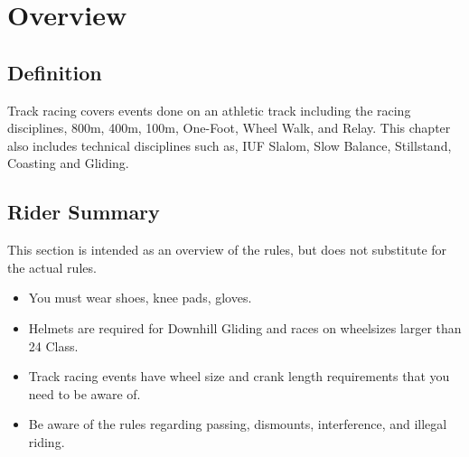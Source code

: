 \chapter{Overview}

\section{Definition}

Track racing covers events done on an athletic track including the racing disciplines, 800m, 400m, 100m, One-Foot, Wheel Walk, and Relay.
This chapter also includes technical disciplines such as, IUF Slalom, Slow Balance, Stillstand, Coasting and Gliding.

\section{Rider Summary}

This section is intended as an overview of the rules, but does not substitute for the actual rules.
\begin{itemize}
\item You must wear shoes, knee pads, gloves.
\item Helmets are required for Downhill Gliding and races on wheelsizes larger than 24 Class.
\item Track racing events have wheel size and crank length requirements that you need to be aware of.
\item Be aware of the rules regarding passing, dismounts, interference, and illegal riding.
\end{itemize}
